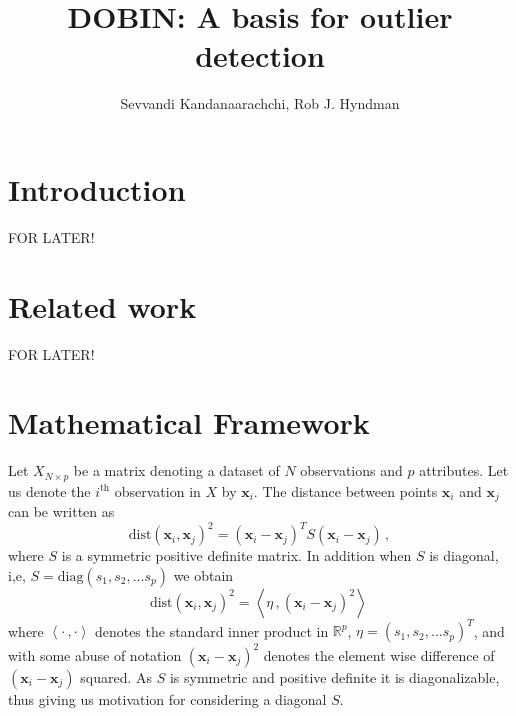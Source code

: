 \documentclass[11pt]{article}
\newcommand{\dist}{\text{dist}}
\newcommand{\diag}{\text{diag}}
\begin{document}
\title{DOBIN: A basis for outlier detection}
\author{Sevvandi Kandanaarachchi, Rob J. Hyndman}
\maketitle
{}

\section{Introduction}
FOR LATER!

\section{Related work}
FOR LATER!

\section{Mathematical Framework}\label{sec:MathFrame}
Let $X_{N \times p}$ be a matrix denoting a dataset of $N$ observations and $p$ attributes. Let us denote the  $i^{\text{th}}$ observation in $X$ by $\bm{x}_i$. The  distance between points $\bm{x}_i$ and $\bm{x}_j$  can be written as 
\begin{equation}\label{eq:secMF1}
\dist(\bm{x}_i, \bm{x}_j)^2 = \left( \bm{x}_i - \bm{x}_j \right)^T S \left( \bm{x}_i - \bm{x}_j \right) \, , 
\end{equation}
where $S$ is a symmetric positive definite matrix.  In addition when $S$ is diagonal, i,e, $S = \diag(s_1, s_2, \ldots s_p)$ we obtain
\begin{equation}\label{eq:secMF2}
    \dist(\bm{x}_i, \bm{x}_j)^2 = \left\langle \eta\, ,  \left( \bm{x}_i - \bm{x}_j \right)^2 \right\rangle\, 
\end{equation}
where $\left\langle \cdot\, , \cdot \right\rangle$ denotes the standard inner product in $\mathbb{R}^p$,   $\eta = \left(s_1, s_2, \ldots s_p\right)^T$, and with some abuse of notation $\left( \bm{x}_i - \bm{x}_j \right)^2$ denotes the element wise difference of $\left( \bm{x}_i - \bm{x}_j \right)$ squared. As $S$ is symmetric and positive definite  it is diagonalizable, thus giving us motivation for considering a diagonal $S$. 
\end{document}

